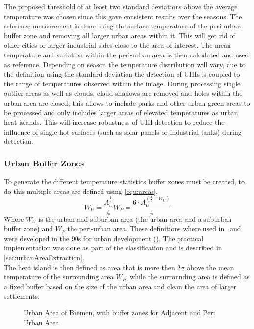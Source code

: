 \documentclass[12pt,a4paper, english]{article}
\begin{document}
    The proposed threshold of at least two standard deviations above the average temperature was chosen since this gave consistent results over the seasons. %
    The reference measurement is done using the surface temperature of the peri-urban buffer zone and removing all larger urban areas within it. 
    This will get rid of other cities or larger industrial sides close to the area of interest.
    The mean temperature and variation within the peri-urban area is then calculated and used as reference.
    Depending on season the temperature distribution will vary, due to the definition using the standard deviation the detection of \glspl{UHI} is coupled to the range of temperatures observed within the image. 
    During processing single outlier areas as well as clouds, cloud shadows are removed and holes within the urban area are closed, this allows to include parks and other urban green areas to be processed and only includes larger areas of elevated temperatures as urban heat islands. 
    This will increase robustness of \gls{UHI} detection to reduce the influence of single hot surfaces (such as solar panels or industrial tanks) during detection.

    \subsubsection{Urban Buffer Zones}\label{sec:urbanBufferzone}
      To generate the different temperature statistics buffer zones must be created, to do this multiple areas are defined using \cref{equ:areas}.
%
      \begin{equation}\label{equ:areas}
	      W_U = \frac{A_U^{\frac{1}{2}}}{4}
	      W_P = \frac{6\cdot A_U^{(\frac{1}{2}-W_U)}}{4}
      \end{equation}
      Where $W_U$ is the urban and suburban area (the urban area and a suburban buffer zone) and $W_P$ the peri-urban area.
      These definitions where used in~\autocite{Sobrino2020} and were developed in the 90s for urban development (\cite{AlkanBala2014}).
      The practical implementation was done as part of the classification and is described in \cref{sec:urbanAreaExtraction}. \\
      The heat island is then defined as area that is more then $2\sigma$ above the mean temperature of the surrounding area $W_P$, while the surrounding area is defined as a fixed buffer based on the size of the urban area and clean the area of larger settlements. 
      \begin{figure}
        
        \caption{Urban Area of Bremen, with buffer zones for Adjacent and Peri Urban Area\label{fig:bufferedBremen}}
      \end{figure}
%
\end{document}
